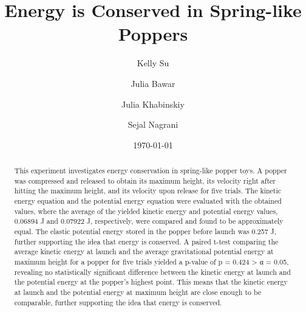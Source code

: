\documentclass[amsmath,amssymb,aps,endfloats,linenumbers]{revtex4-2}
\begin{document}

\title{Energy is Conserved in Spring-like Poppers}
\author{Kelly Su}
\author{Julia Bawar}
\author{Julia Khabinskiy}
\author{Sejal Nagrani}
\date{\today}


\begin{abstract}
This experiment investigates energy conservation in spring-like popper toys. A popper was compressed and released to obtain its maximum height, its velocity right after hitting the maximum height, and its velocity upon release for five trials. The kinetic energy equation and the potential energy equation were evaluated with the obtained values, where the average of the yielded kinetic energy and potential energy values, 0.06894 J and 0.07922 J, respectively, were compared and found to be approximately equal. The elastic potential energy stored in the popper before launch was 0.257 J, further supporting the idea that energy is conserved. A paired t-test comparing the average kinetic energy at launch and the average gravitational potential energy at maximum height for a popper for five trials yielded a p-value of p = 0.424 > α = 0.05, revealing no statistically significant difference between the kinetic energy at launch and the potential energy at the popper’s highest point. This means that the kinetic energy at launch and the potential energy at maximum height are close enough to be comparable, further supporting the idea that energy is conserved.
\end{abstract}


\maketitle\thispagestyle{mytitlepage}

\end{document}
